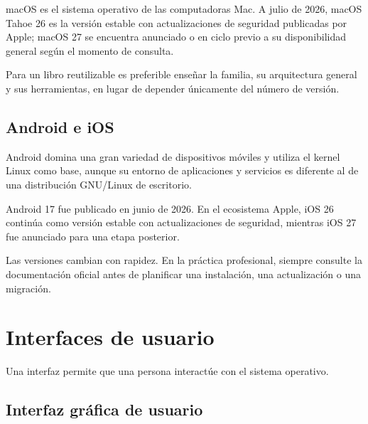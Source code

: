 \documentclass[
  spanish,
  letterpaper,
]{scrbook}
\begin{document}
macOS es el sistema operativo de las computadoras Mac. A julio de 2026,
macOS Tahoe 26 es la versión estable con actualizaciones de seguridad
publicadas por Apple; macOS 27 se encuentra anunciado o en ciclo previo
a su disponibilidad general según el momento de consulta.

Para un libro reutilizable es preferible enseñar la familia, su
arquitectura general y sus herramientas, en lugar de depender únicamente
del número de versión.

\section{Android e iOS}\label{android-e-ios}

Android domina una gran variedad de dispositivos móviles y utiliza el
kernel Linux como base, aunque su entorno de aplicaciones y servicios es
diferente al de una distribución GNU/Linux de escritorio.

Android 17 fue publicado en junio de 2026. En el ecosistema Apple, iOS
26 continúa como versión estable con actualizaciones de seguridad,
mientras iOS 27 fue anunciado para una etapa posterior.

\begin{tcolorbox}[enhanced jigsaw, arc=.35mm, bottomrule=.15mm, bottomtitle=1mm, breakable, colback=white, colbacktitle=quarto-callout-tip-color!10!white, colframe=quarto-callout-tip-color-frame, coltitle=black, left=2mm, leftrule=.75mm, opacityback=0, opacitybacktitle=0.6, rightrule=.15mm, title=\textcolor{quarto-callout-tip-color}{\faLightbulb}\hspace{0.5em}{Consejo del Ingeniero}, titlerule=0mm, toprule=.15mm, toptitle=1mm]

Las versiones cambian con rapidez. En la práctica profesional, siempre
consulte la documentación oficial antes de planificar una instalación,
una actualización o una migración.

\end{tcolorbox}


\chapter{Interfaces de usuario}\label{interfaces-de-usuario}

Una interfaz permite que una persona interactúe con el sistema
operativo.

\section{Interfaz gráfica de
usuario}\label{interfaz-gruxe1fica-de-usuario}
\end{document}
